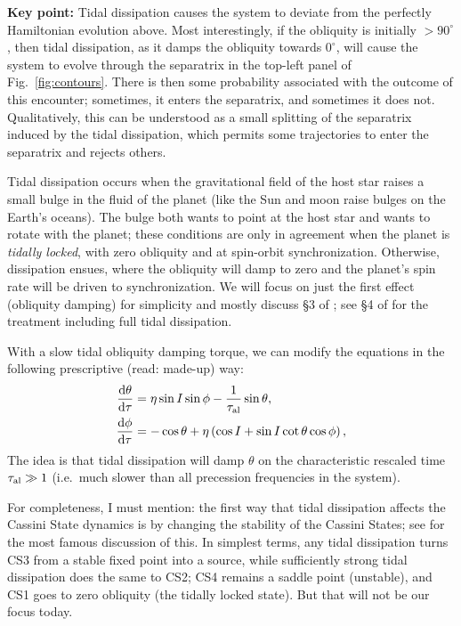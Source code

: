 \documentclass[11pt,
        usenames, %
        dvipsnames %
    ]{article}
\newcommand*{\rd}[2]{\frac{\mathrm{d}#1}{\mathrm{d}#2}}
\newcommand*{\p}[1]{\left(#1\right)}
\begin{document}
\textbf{Key point:} Tidal dissipation causes the system to deviate from the
perfectly Hamiltonian evolution above. Most interestingly, if the obliquity is
initially $> 90^\circ$, then tidal dissipation, as it damps the obliquity
towards $0^\circ$, will cause the system to evolve through the separatrix in the
top-left panel of Fig.~\ref{fig:contours}. There is then some probability
associated with the outcome of this encounter; sometimes, it enters the
separatrix, and sometimes it does not. Qualitatively, this can be understood as
a small splitting of the separatrix induced by the tidal dissipation, which
permits some trajectories to enter the separatrix and rejects others.

Tidal dissipation occurs when the gravitational field of the host star raises a
small bulge in the fluid of the planet (like the Sun and moon raise bulges on
the Earth's oceans). The bulge both wants to point at the host star and wants to
rotate with the planet; these conditions are only in agreement when the planet
is \emph{tidally locked}, with zero obliquity and at spin-orbit synchronization.
Otherwise, dissipation ensues, where the obliquity will damp to zero and the
planet's spin rate will be driven to synchronization. We will focus on just the
first effect (obliquity damping) for simplicity and mostly discuss \S3 of
\citet{su2022dynamics}; see \S4 of \citet{su2022dynamics} for the treatment
including full tidal dissipation.

With a slow tidal obliquity damping torque, we can modify the equations in the
following prescriptive (read: made-up) way:
\begin{align}
    \rd{\theta}{\tau} &= \eta\sin I \sin \phi
        - \frac{1}{\tau_{\rm al}} \sin \theta, \label{eq:dqdt_toy}\\
    \rd{\phi}{\tau} &= - \cos\theta
        + \eta\p{\cos I + \sin I \cot \theta \cos \phi},\label{eq:dfdt_toy}
\end{align}
The idea is that tidal dissipation will damp $\theta$ on the characteristic
rescaled time $\tau_{\rm al} \gg 1$ (i.e.\ much slower than all precession
frequencies in the system).

For completeness, I must mention: the first way that tidal dissipation affects the
Cassini State dynamics is by changing the stability of the Cassini States; see
\citet{fabrycky2007cassini} for the most famous discussion of this. In simplest
terms, any tidal dissipation turns CS3 from a stable fixed point into a source,
while sufficiently strong tidal dissipation does the same to CS2; CS4 remains a
saddle point (unstable), and CS1 goes to zero obliquity (the tidally locked
state). But that will not be our focus today.
\end{document}
